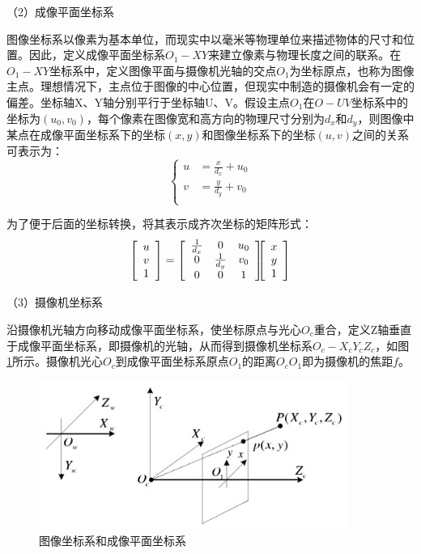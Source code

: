 （2）成像平面坐标系

图像坐标系以像素为基本单位，而现实中以毫米等物理单位来描述物体的尺寸和位置。因此，定义成像平面坐标系$O_1-XY$来建立像素与物理长度之间的联系。在$O_1-XY$坐标系中，定义图像平面与摄像机光轴的交点$O_1$为坐标原点，也称为图像主点。理想情况下，主点位于图像的中心位置，但现实中制造的摄像机会有一定的偏差。坐标轴X、Y轴分别平行于坐标轴U、V。假设主点$O_1$在$O-UV$坐标系中的坐标为$(u_0, v_0)$，每个像素在图像宽和高方向的物理尺寸分别为$d_x$和$d_y$，则图像中某点在成像平面坐标系下的坐标$(x, y)$和图像坐标系下的坐标$(u,v )$之间的关系可表示为：
%
\begin{equation}\label{eq:2_1_image_coord}
\left\{
	\begin{aligned}
	u&=\frac{x}{d_x}+u_0 \\
	v&=\frac{y}{d_y}+v_0 \\
	\end{aligned}
\right.
\end{equation}

为了便于后面的坐标转换，将其表示成齐次坐标的矩阵形式：
\begin{eqnarray}\label{eq:2_1_image_coord_homogeneous}
\left[\begin{array}{c} u \\ v \\ 1 \end{array} \right]
=
\left[\begin{array}{ccc}
\frac{1}{d_x} & 0 & u_0 \\
0 & \frac{1}{d_y} & v_0 \\
0 & 0 & 1
\end{array}
\right]
\hspace{-6pt} %
\left[\begin{array}{c} x \\ y \\ 1 \end{array}\right]
\end{eqnarray}

（3）摄像机坐标系

沿摄像机光轴方向移动成像平面坐标系，使坐标原点与光心$O_c$重合，定义Z轴垂直于成像平面坐标系，即摄像机的光轴，从而得到摄像机坐标系$O_c-X_cY_cZ_c$，如图\ref{fig:2_1_camera_and_world_coord}所示。摄像机光心$O_c$到成像平面坐标系原点$O_1$的距离$O_c O_1$即为摄像机的焦距$f$。

\begin{figure}[!htb] %
	\centering
	\includegraphics[width=4in]{figures/2_1_camera_and_world_coord}
	\caption{图像坐标系和成像平面坐标系}\label{fig:2_1_camera_and_world_coord}
\end{figure}

